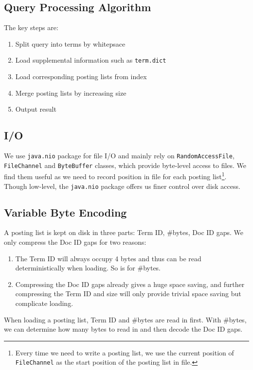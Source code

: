 \documentclass{article}
\begin{document}
\subsection{Query Processing Algorithm}

The key steps are:

\begin{enumerate}
  \item Split query into terms by whitepsace
  \item Load supplemental information such as \texttt{term.dict}
  \item Load corresponding posting lists from index
  \item Merge posting lists by increasing size
  \item Output result
\end{enumerate}

\subsection{I/O}

We use {\texttt{java.nio}} package for file I/O and mainly rely on
{\texttt{RandomAccessFile}}, {\texttt{FileChannel}} and {\texttt{ByteBuffer}}
classes, which provide byte-level access to files. We
find them useful as we need to record position in file for each posting
list{\footnote{Every time we need to write a posting list, we use the current
position of {\texttt{FileChannel}} as the start position of the posting list in
file.}}. Though low-level, the {\texttt{java.nio}} package offers us finer
control over disk access.

\subsection{Variable Byte Encoding}

A posting list is kept on disk in three parts: Term ID, \#bytes, Doc ID gaps.
We only compress the Doc ID gaps for two reasons:
\begin{enumerate}
  \item The Term ID will always occupy 4 bytes and thus can be read
  deterministically when loading. So is for \#bytes.
  
  \item Compressing the Doc ID gaps already gives a huge space saving, and
  further compressing the Term ID and size will only provide trivial space
  saving but complicate loading.
\end{enumerate}
When loading a posting list, Term ID and \#bytes are read in first. With
\#bytes, we can determine how many bytes to read in and then decode the Doc ID
gaps.
\end{document}
